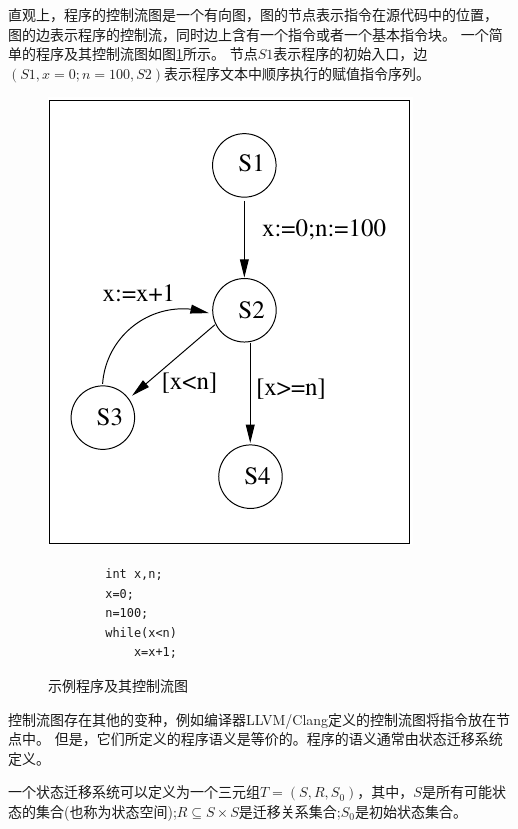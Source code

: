 直观上，程序的控制流图是一个有向图，图的节点表示指令在源代码中的位置，
图的边表示程序的控制流，同时边上含有一个指令或者一个基本指令块。
一个简单的程序及其控制流图如图\ref{fig-example}所示。
节点$S1$表示程序的初始入口，边$(S1, x=0;n=100, S2)$表示程序文本中顺序执行的赋值指令序列。

\begin{figure}[h]
	\begin{minipage}{.5\textwidth}
		\centering
		\includegraphics{figures/chap04/example1.pdf}
	\end{minipage}
	\begin{minipage}{.5\textwidth}
		\centering
		\begin{lstlisting}
		int x,n;
		x=0;
		n=100;
		while(x<n)
			x=x+1;
		\end{lstlisting}
	\end{minipage}
	\caption{示例程序及其控制流图}
	\label{fig-example}
\end{figure}


控制流图存在其他的变种，例如编译器LLVM/Clang定义的控制流图将指令放在节点中。
但是，它们所定义的程序语义是等价的。程序的语义通常由状态迁移系统定义。

\begin{definition}
一个状态迁移系统可以定义为一个三元组$T=(S, R, S_0)$，其中，$S$是所有可能状态的集合(也称为状态空间);$R \subseteq S \times S $是迁移关系集合;$S_0$是初始状态集合。
\end{definition}


